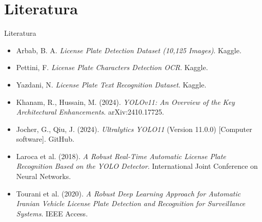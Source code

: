 \documentclass{beamer}
\begin{document}
\section{Literatura}

\begin{frame}{Literatura}

\small

\begin{itemize}
    \item Arbab, B. A. \textit{License Plate Detection Dataset (10,125 Images)}. Kaggle.\\

    \item Pettini, F. \textit{License Plate Characters Detection OCR}. Kaggle.\\

    \item Yazdani, N. \textit{License Plate Text Recognition Dataset}. Kaggle.\\

    \item Khanam, R., Hussain, M. (2024).
    \textit{YOLOv11: An Overview of the Key Architectural Enhancements}.
    arXiv:2410.17725.

    \item Jocher, G., Qiu, J. (2024).
    \textit{Ultralytics YOLO11} (Version 11.0.0) [Computer software].
    GitHub.\\

    \item Laroca et al. (2018).
    \textit{A Robust Real-Time Automatic License Plate Recognition Based on the YOLO Detector}.
    International Joint Conference on Neural Networks.

    \item Tourani et al. (2020).
    \textit{A Robust Deep Learning Approach for Automatic Iranian Vehicle License Plate Detection and Recognition for Surveillance Systems}. IEEE Access.
\end{itemize}

\end{frame}
\end{document}
